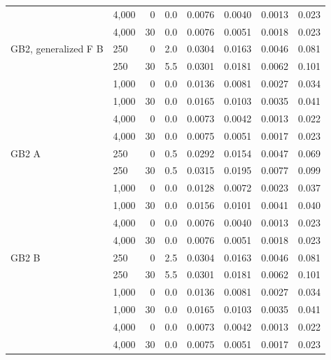 {\begin{longtable}{llrrrrrr}
 & 4,000 & 0 & 0.0 & 0.0076 & 0.0040 & 0.0013 & 0.023 \\
 & 4,000 & 30 & 0.0 & 0.0076 & 0.0051 & 0.0018 & 0.023 \\
GB2, generalized F B & 250 & 0 & 2.0 & 0.0304 & 0.0163 & 0.0046 & 0.081 \\
 & 250 & 30 & 5.5 & 0.0301 & 0.0181 & 0.0062 & 0.101 \\
 & 1,000 & 0 & 0.0 & 0.0136 & 0.0081 & 0.0027 & 0.034 \\
 & 1,000 & 30 & 0.0 & 0.0165 & 0.0103 & 0.0035 & 0.041 \\
 & 4,000 & 0 & 0.0 & 0.0073 & 0.0042 & 0.0013 & 0.022 \\
 & 4,000 & 30 & 0.0 & 0.0075 & 0.0051 & 0.0017 & 0.023 \\
GB2 A & 250 & 0 & 0.5 & 0.0292 & 0.0154 & 0.0047 & 0.069 \\
 & 250 & 30 & 0.5 & 0.0315 & 0.0195 & 0.0077 & 0.099 \\
 & 1,000 & 0 & 0.0 & 0.0128 & 0.0072 & 0.0023 & 0.037 \\
 & 1,000 & 30 & 0.0 & 0.0156 & 0.0101 & 0.0041 & 0.040 \\
 & 4,000 & 0 & 0.0 & 0.0076 & 0.0040 & 0.0013 & 0.023 \\
 & 4,000 & 30 & 0.0 & 0.0076 & 0.0051 & 0.0018 & 0.023 \\
GB2 B & 250 & 0 & 2.5 & 0.0304 & 0.0163 & 0.0046 & 0.081 \\
 & 250 & 30 & 5.5 & 0.0301 & 0.0181 & 0.0062 & 0.101 \\
 & 1,000 & 0 & 0.0 & 0.0136 & 0.0081 & 0.0027 & 0.034 \\
 & 1,000 & 30 & 0.0 & 0.0165 & 0.0103 & 0.0035 & 0.041 \\
 & 4,000 & 0 & 0.0 & 0.0073 & 0.0042 & 0.0013 & 0.022 \\
 & 4,000 & 30 & 0.0 & 0.0075 & 0.0051 & 0.0017 & 0.023 \\
\end{longtable}}
